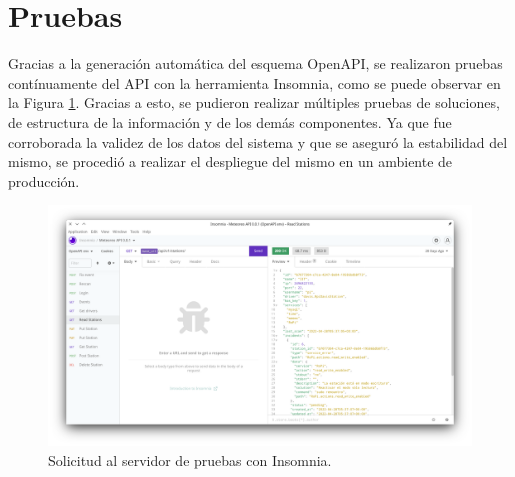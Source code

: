 \section{Pruebas}

Gracias a la generación automática del esquema OpenAPI, se realizaron pruebas contínuamente del API con la herramienta Insomnia, como se puede observar en la Figura \ref{fig:insomnia-stations-request}. Gracias a esto, se pudieron realizar múltiples pruebas de soluciones, de estructura de la información y de los demás componentes. Ya que fue corroborada la validez de los datos del sistema y que se aseguró la estabilidad del mismo, se procedió a realizar el despliegue del mismo en un ambiente de producción.

\begin{figure}[!ht]
	\centering
	\includegraphics[width=1\linewidth]{images/screenshots/insomnia_stations.png}
	\caption{Solicitud al servidor de pruebas con Insomnia.}
	\label{fig:insomnia-stations-request}
\end{figure}

